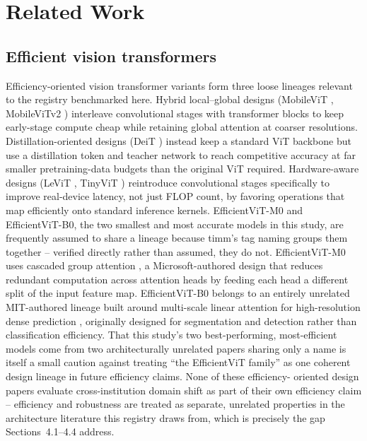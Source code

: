 \documentclass[runningheads]{llncs}
\begin{document}
\section{Related Work}

\subsection{Efficient vision transformers}

Efficiency-oriented vision transformer variants form three loose lineages
relevant to the registry benchmarked here. Hybrid local--global designs
(MobileViT \cite{mehta2022mobilevit}, MobileViTv2
\cite{mehta2022mobilevitv2}) interleave convolutional stages with
transformer blocks to keep early-stage compute cheap while retaining
global attention at coarser resolutions. Distillation-oriented designs
(DeiT \cite{touvron2021deit}) instead keep a standard ViT backbone but use
a distillation token and teacher network to reach competitive accuracy at
far smaller pretraining-data budgets than the original ViT
\cite{dosovitskiy2021vit} required. Hardware-aware designs (LeViT
\cite{graham2021levit}, TinyViT \cite{wu2022tinyvit}) reintroduce
convolutional stages specifically to improve real-device latency, not
just FLOP count, by favoring operations that map efficiently onto
standard inference kernels. EfficientViT-M0 and EfficientViT-B0, the two
smallest and most accurate models in this study, are frequently assumed to
share a lineage because timm's tag naming groups them together --
verified directly rather than assumed, they do not. EfficientViT-M0 uses
cascaded group attention \cite{liu2023efficientvit}, a Microsoft-authored
design that reduces redundant computation across attention heads by
feeding each head a different split of the input feature map.
EfficientViT-B0 belongs to an entirely unrelated MIT-authored lineage
built around multi-scale linear attention for high-resolution dense
prediction \cite{cai2023efficientvit}, originally designed for
segmentation and detection rather than classification efficiency. That
this study's two best-performing, most-efficient models come from two
architecturally unrelated papers sharing only a name is itself a small
caution against treating ``the EfficientViT family'' as one coherent
design lineage in future efficiency claims. None of these efficiency-
oriented design papers evaluate cross-institution domain shift as part of
their own efficiency claim -- efficiency and robustness are treated as
separate, unrelated properties in the architecture literature this
registry draws from, which is precisely the gap Sections~4.1--4.4 address.
\end{document}
